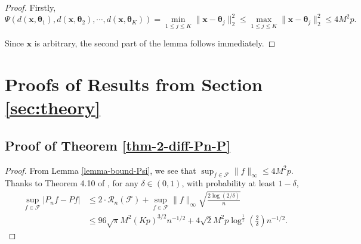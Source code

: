 \documentclass{article}
\begin{document}
\begin{proof}
    Firstly,
    \begin{equation*}
        \Psi(d(\bm{x},\bm{\theta}_1), d(\bm{x},\bm{\theta}_2),\cdots, d(\bm{x},\bm{\theta}_K) ) = \min_{1\le j\le K}\|\bm{x}-\bm{\theta}_j\|_2^2 \le \max_{1\le j\le K}\|\bm{x}-\bm{\theta}_j\|_2^2 \le 4M^2p.
    \end{equation*}

    Since $\bm{x}$ is arbitrary, the second part of the lemma follows immediately.
\end{proof}

\section{Proofs of Results from Section \ref{sec:theory}}


\subsection{Proof of Theorem \ref{thm-2-diff-Pn-P}}

\begin{proof}
    From Lemma \ref{lemma-bound-Psi}, we see that $\sup_{f\in \mathcal{F}}\|f\|_{\infty}\le 4M^2p$. Thanks to Theorem 4.10 of \citep{wainwright_2019}, for any $\delta \in (0,1)$, with probability at least $1-\delta$, 
    \begin{align*}
        \sup_{f\in \mathcal{F}}|P_n f-Pf| &\le 2\cdot\mathcal{R}_n(\mathcal{F})+\sup_{f\in \mathcal{F}}\|f\|_{\infty}\sqrt{\frac{2\log(2/\delta)}{n}}\\
        &\le 96\sqrt{\pi}M^2(Kp)^{3/2}n^{-1/2}+4\sqrt{2}M^2p\log^{\tfrac{1}{2}}\left(\frac{2}{\delta}\right) n^{-1/2}.
    \end{align*}
\end{proof}
\end{document}
